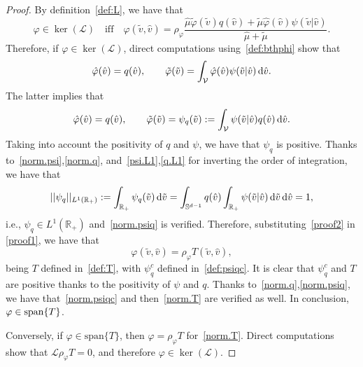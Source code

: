 \documentclass[a4paper]{article}
\theoremstyle{Theorem}\newtheorem{proposition}{Proposition}[section]
\theoremstyle{Remark}\newtheorem{remark}{Remark}[section]
\theoremstyle{Theorem}\newtheorem{theorem}{Theorem}[section]
\newcommand{\R}{\mathbb{R}}
\newcommand{\hv}{\hat{v}}
\newcommand{\tv}{\tilde{v}}
\newcommand{\hphi}{\hat{\varphi}}
\newcommand{\tphi}{\tilde{\varphi}}
\newcommand{\hmu}{\hat{\mu}}
\newcommand{\tmu}{\tilde{\mu}}
\newcommand{\intS}{\int_{\mathbb{S}^{d-1}}}
\newcommand{\intR}{\int_{\R_+}}
\newcommand{\intV}{\int_{\mathcal{V}}}
\begin{document}
\begin{proof}
 By definition~\eqref{def:L}, we have that
 \begin{equation}\label{proof1}
 \varphi \in \ker(\mathcal{L}) \quad \text{iff} \quad \varphi(\tv,\hv) = \rho_{\varphi}\dfrac{\hmu \tphi(\tv)q(\hv)+\tmu\hphi (\hv) \psi(\tv|\hv)}{\hmu+\tmu}.
 \end{equation}
 Therefore, if $\varphi \in \ker(\mathcal{L})$, direct computations using~\eqref{def:bthphi} show that
 \[
 \hphi(\hv)= q(\hv), \qquad \tphi(\tv) = \intV \hphi(\hv) \psi(\tv|\hv) \, {\rm d} \hv.
 \]
 The latter implies that
\begin{equation}\label{proof2}
\hphi(\hv)= q(\hv), \qquad \tphi(\tv) = \psi_q(\tv) := \intV  \psi(\tv|\hv) q(\hv) \, {\rm d} \hv.
\end{equation}
Taking into account the positivity of $q$ and $\psi$, we have that $\psi_q$ is positive. Thanks to~\eqref{norm.psi},\eqref{norm.q}, and~\eqref{psi.L1},\eqref{q.L1} for inverting the order of integration, we have that 
\[
||\psi_q||_{L^1(\R_+)}:= \intR \psi_q(\tv) \, {\rm d} \tv = \intS q(\hv) \intR \psi(\tv|\hv) \, {\rm d} \tv \, {\rm d} \hv =1,
\]
i.e., $\psi_q \in L^1(\R_+)$ and~\eqref{norm.psiq} is verified.
Therefore, substituting~\eqref{proof2} in \eqref{proof1}, we have that
\[
\varphi(\tv,\hv)=\rho_{\varphi} T(\tv, \hv),
\]
being $T$ defined in~\eqref{def:T}, with $\psi_q^c$ defined in~\eqref{def:psiqc}. It is clear that $\psi_q^c$ and $T$ are positive thanks to the positivity of $\psi$ and $q$. Thanks to~\eqref{norm.q},\eqref{norm.psiq}, we have that~\eqref{norm.psiqc} and then~\eqref{norm.T} are verified as well. In conclusion, $\varphi \in {\rm span} \lbrace T \rbrace$. 

Conversely, if $\varphi \in \text{span}\lbrace T \rbrace$, then $\varphi=\rho_{\varphi} T$ for~\eqref{norm.T}. Direct computations show that $\mathcal{L}\rho_\varphi T=0$, and therefore $\varphi \in \ker(\mathcal{L})$.
\end{proof}
\end{document}
